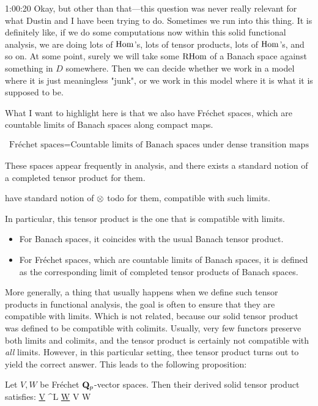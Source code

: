 \begin{unfinished}{1:00:20}
% 
Okay, but other than that---this question was never really relevant for what Dustin and I have been trying to do. Sometimes we run into this thing. 
It is definitely like, if we do some computations now within this solid functional analysis, we are doing lots of $\operatorname{Hom}$'s, lots of tensor products, lots of $\operatorname{Hom}$'s, and so on. 
At some point, surely we will take some $\operatorname{RHom}$ of a Banach space against something in $D$ somewhere. 
Then we can decide whether we work in a model where it is just meaningless "junk", or we work in this model where it is what it is supposed to be.

What I want to highlight here is that we also have Fréchet spaces, which are countable limits of Banach spaces along compact maps. 

\begin{align*}
\text{Fréchet spaces} = \text{Countable limits of Banach spaces under dense transition maps}
\end{align*}

These spaces appear frequently in analysis, and there exists a standard notion of a completed tensor product for them. 

have standard notion of $\otimes$ todo for them, compatible with such limits.

In particular, this tensor product is the one that is compatible with limits. 
\begin{itemize}
\item For Banach spaces, it coincides with the usual Banach tensor product.
\item For Fréchet spaces, which are countable limits of Banach spaces, it is defined as the corresponding limit of completed tensor products of Banach spaces. 
\end{itemize}

More generally, a thing that usually happens when we define such tensor products in functional analysis, the goal is often to ensure that they are compatible with limits. 
%
Which is not related, because our solid tensor product was defined to be compatible with colimits. 
Usually, very few functors preserve both limits and colimits, and the tensor product is certainly not compatible with \emph{all} limits. 
%
However, in this particular setting, thee tensor product turns out to yield the correct answer. This leads to the following proposition:

\bp
Let $V, W$ be Fréchet $\mathbf Q_p$-vector spaces. Then their derived solid tensor product satisfies:
\be
\underline{V} \tnsr^{L\solid} \underline{W} \simeq V \hat{\tnsr} W
\ee
\ep


\end{unfinished}
